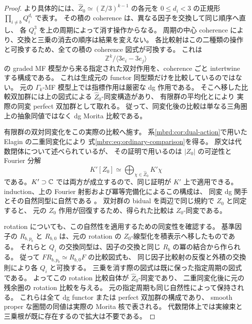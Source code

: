 \begin{proof}
より具体的には、$\widehat Z_0\simeq(\mathbb Z/3)^{k-1}$ の各元を
$0\le d_i<3$ の正規形 $\prod_{i\ne b}Q_i^{d_i}$ で表す。
その積の coherence は、異なる因子を交換して同じ順序へ直し、
各 $Q_i^3$ を上の周期によって消す操作からなる。
周期の中心 coherence により、交換と三乗の消去の順序は結果を変えない。
各比較射はこの二種類の操作と可換するため、全ての積の coherence 図式が可換する。
これは
\[
 \mathbb Z^k/\langle3e_i-3e_j\rangle
\]
の graded MF 模型から来る指定された双対作用を、coherence ごと intertwine する構成である。
これは生成元の functor 同型類だけを比較しているのではない。
元の $\Gamma_k$-MF 模型上では指標作用は厳密な dg 作用である。
そこへ移した比較双加群には上の図式による $\widehat Z_0$-同変構造があり、
有限群の平均化と\cite[Lemma~8.6]{MEDElagin}により
実際の同変 perfect 双加群として取れる。
従って、同変化後の比較は単なる三角圏上の抽象同値ではなく dg Morita 比較である。

有限群の双対同変化をこの実際の比較へ施す。
系\ref{mbrd:cor:dual-action}で用いた Elagin の二重同変化により
式\eqref{mbrc:eq:ordinary-comparison}を得る。
原文\cite[Theorem~4.2]{MEDElagin}は代数閉体について述べられているが、
その証明で用いるのは $|Z_0|$ の可逆性と Fourier 分解
\[
 K'[Z_0]\simeq\bigoplus_{\chi\in\widehat Z_0}K'\chi
\]
である。$K'\supset\mathbb C$ では両方が成立するので、同じ証明が $K'$ 上で適用できる。
induction、上の Fourier 射影および冪等完備化によるこの構成は、
同変 dg 関手とその自然同型に自然である
\cite[Proposition~4.1, Lemma~8.6, Theorems~8.7, 8.9]{MEDElagin}。
双対群の bidual を両辺で同じ規約で $Z_0$ と同定すると、
元の $Z_0$ 作用が回復するため、得られた比較は $Z_0$-同変である。

rotation についても、この自然性を適用するための同変性を確認する。
基準因子の $R_{b,p_b}$ と $R_{b,0}$ は、元の rotation の
$Z_0$-線型化を積表示へ移したものである。
それらと $Q_i$ の交換同型は、因子の交換と同じ $R_b$ の冪の結合から作られる。
従って $FR_{b,p_b}\simeq R_{b,0}F$ の比較図式も、
同じ因子比較射の反復と外積の交換則により各 $Q_i$ と可換する。
三乗を消す際の図式は既に保った指定周期の図式である。
よってこの rotation 比較自体が $\widehat Z_0$-同変であり、
二重同変化後に元の残余圏の rotation 比較を与える。
元の指定周期も同じ自然性によって保持される。
これらは全て dg functor または perfect 双加群の構成であり、
smooth proper な圏間の同値は実際の Morita 核で表される。
代数閉体上では実線束と三乗根が既に存在するので拡大は不要である。
\end{proof}

